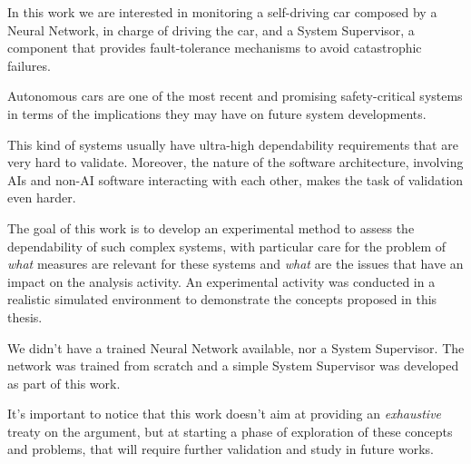 In this work we are interested in monitoring a self-driving car composed by a Neural Network, in charge of driving the car, and a System Supervisor, a component that provides fault-tolerance mechanisms to avoid catastrophic failures.

Autonomous cars are one of the most recent and promising safety-critical systems in terms of the implications they may have on future system developments.

This kind of systems usually have ultra-high dependability requirements that are very hard to validate. Moreover, the nature of the software architecture, involving AIs and non-AI software interacting with each other, makes the task of validation even harder.

The goal of this work is to develop an experimental method to assess the dependability of such complex systems, with particular care for the problem of \textsl{what} measures are relevant for these systems and \textsl{what} are the issues that have an impact on the analysis activity.
An experimental activity was conducted in a realistic simulated environment to demonstrate the concepts proposed in this thesis.

We didn't have a trained Neural Network available, nor a System Supervisor. The network was trained from scratch and a simple System Supervisor was developed as part of this work.

It's important to notice that this work doesn't aim at providing an \textsl{exhaustive} treaty on the argument, but at starting a phase of exploration of these concepts and problems, that will require further validation and study in future works.